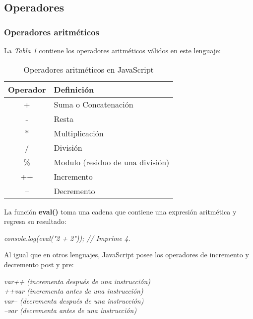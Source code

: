\subsection{Operadores}

\subsubsection{Operadores aritméticos}
\hspace{0.55cm}La \textit{Tabla \ref{tab: 2}} contiene los operadores aritméticos válidos en este lenguaje:
\begin{table}[H]
    \begin{center}
        \caption{Operadores aritméticos en JavaScript}
        \label{tab: 2}
        \begin{tabular}{c l}
            \hline
            \textbf{Operador}&\textbf{Definición} \\
            \hline
            + & Suma o Concatenación \\
            - & Resta \\
            $\ast$ & Multiplicación \\
            / & División \\
            \% & Modulo (residuo de una división) \\
            ++ & Incremento \\
            -- & Decremento \\
            \hline
        \end{tabular}
    \end{center}
\end{table}

La función \textbf{eval()} toma una cadena que contiene una expresión aritmética y regresa su resultado:
\begin{center}
    \textit{console.log(eval("2 + 2")); // Imprime 4.}
\end{center}

Al igual que en otros lenguajes, JavaScript posee los operadores de incremento y decremento post y pre:
\begin{center}
    \textit{
            var++ (incrementa después de una instrucción) \\
            ++var (incrementa antes de una instrucción) \\
            var-- (decrementa después de una instrucción) \\
            --var (decrementa antes de una instrucción) \\
    }
\end{center}


